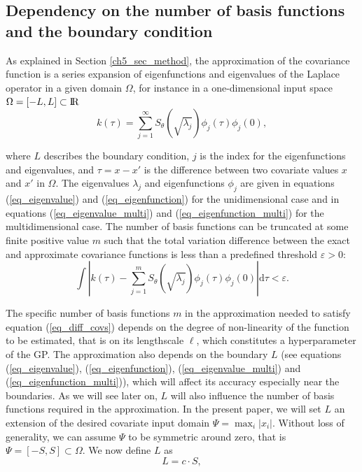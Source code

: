 \documentclass[onecolumn,a4paper,11pt]{article}
\begin{document}
\subsection{Dependency on the number of basis functions and the boundary condition} \label{ch5_subsec_dependency}

As explained in Section \ref{ch5_sec_method}, the approximation of the covariance function is a series expansion of eigenfunctions and eigenvalues of the Laplace operator in a given domain $\Omega$, for instance in a one-dimensional input space $\Omega=[-L,L]\subset {\rm I\!R}$
%
\begin{equation*}
k(\tau) = \sum_{j=1}^{\infty} S_{\theta}(\sqrt{\lambda_j}) \phi_j(\tau) \phi_j(0), 
\end{equation*} 

\noindent where $L$ describes the boundary condition, $j$ is the index for the eigenfunctions and eigenvalues, and $\tau=x-x'$ is the difference between two covariate values $x$ and $x'$ in $\Omega$. The eigenvalues $\lambda_j$ and eigenfunctions $\phi_j$ are given in equations (\ref{eq_eigenvalue}) and (\ref{eq_eigenfunction}) for the unidimensional case and in equations (\ref{eq_eigenvalue_multi}) and (\ref{eq_eigenfunction_multi}) for the multidimensional case. The number of basis functions can be truncated at some finite positive value $m$ such that the total variation difference between the exact and approximate covariance functions is less than a predefined threshold $\varepsilon > 0$:
%
\begin{equation}\label{eq_diff_covs}
 \int | k(\tau) - \sum_{j=1}^m S_{\theta}(\sqrt{\lambda_j}) \phi_j(\tau) \phi_j(0)|  \mathrm{d}\tau  < \varepsilon.
\end{equation}

The specific number of basis functions  $m$ in the approximation needed to satisfy equation (\ref{eq_diff_covs}) depends on the degree of non-linearity of the function to be estimated, that is on its lengthscale $\ell$, which constitutes a hyperparameter of the GP. The approximation also depends on the boundary $L$ (see equations (\ref{eq_eigenvalue}), (\ref{eq_eigenfunction}), (\ref{eq_eigenvalue_multi}) and (\ref{eq_eigenfunction_multi})), which will affect its accuracy especially near the boundaries. As we will see later on, $L$ will also influence the number of basis functions required in the approximation. In the present paper, we will set $L$ an extension of the desired covariate input domain $\Psi = \max_{i}|x_i|$. Without loss of generality, we can assume $\Psi$ to be symmetric around zero, that is $\Psi=[-S,S] \subset \Omega$. We now define $L$ as
%
\begin{equation}\label{eq_boundary}
L=c \cdot S,
\end{equation} 
\end{document}
